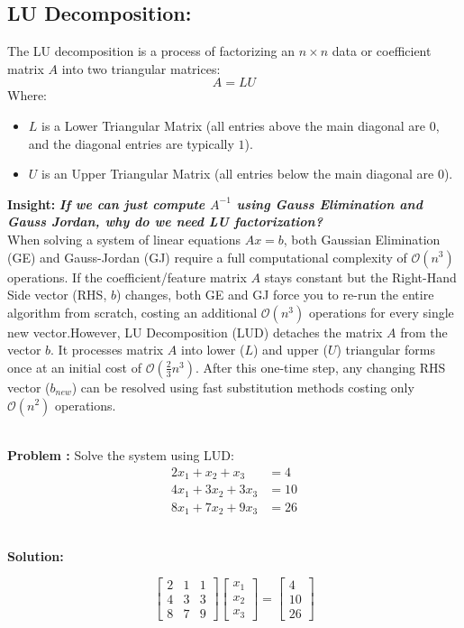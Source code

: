 \documentclass[DIV=20,oneside]{scrartcl}
\newcounter{problem}
\newcommand{\problem}{
	\stepcounter{problem}
	\noindent\textbf{\\Problem \theproblem: }
}
\newcommand{\insight}[1]{%
	\begin{tcolorbox}[
		colback=black!20,
		colframe=black,
		boxrule=0.5pt,
		arc=2mm]
		\textbf{Insight: } #1
	\end{tcolorbox}
}
\newcommand{\solution}{
	\noindent\textbf{\\Solution: }
}
\begin{document}
	\subsection{LU Decomposition: }
	The LU decomposition is a process of factorizing an $n \times n$ data or coefficient matrix $A$ into two triangular matrices:
	$$A = LU$$
	Where: 
	\begin{itemize}[itemsep=0.5pt, topsep=1pt]
		\item $L$ is a Lower Triangular Matrix (all entries above the main diagonal are $0$, and the diagonal entries are typically $1$).
		\item $U$ is an Upper Triangular Matrix (all entries below the main diagonal are $0$).
	\end{itemize}
	\insight{{\textbf{\textit{If we can just compute $A^{-1}$ using Gauss Elimination and Gauss Jordan, why do we need LU factorization?}}}
	\\When solving a system of linear equations $Ax = b$, both Gaussian Elimination (GE) and Gauss-Jordan (GJ) require a full computational complexity of $\mathcal{O}(n^3)$ operations. If the coefficient/feature matrix $A$ stays constant but the Right-Hand Side vector (RHS, $b$) changes, both GE and GJ force you to re-run the entire algorithm from scratch, costing an additional $\mathcal{O}(n^3)$ operations for every single new vector.However, LU Decomposition (LUD) detaches the matrix $A$ from the vector $b$. It processes matrix $A$ into lower ($L$) and upper ($U$) triangular forms once at an initial cost of $\mathcal{O}(\frac{2}{3}n^3)$. After this one-time step, any changing RHS vector ($b_{new}$) can be resolved using fast substitution methods costing only $\mathcal{O}(n^2)$ operations.}
\problem Solve the system using LUD:
$$\begin{aligned}
	2x_1 + x_2 + x_3 &= 4 \\
	4x_1 + 3x_2 + 3x_3 &= 10 \\
	8x_1 + 7x_2 + 9x_3 &= 26
\end{aligned}$$
\solution
$$\begin{bmatrix} 2 & 1 & 1 \\ 4 & 3 & 3 \\ 8 & 7 & 9 \end{bmatrix} \begin{bmatrix} x_1 \\ x_2 \\ x_3 \end{bmatrix} = \begin{bmatrix} 4 \\ 10 \\ 26 \end{bmatrix}$$
\end{document}
